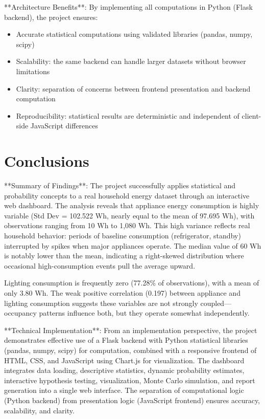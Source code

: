 \documentclass[12pt,a4paper]{article}
\begin{document}
**Architecture Benefits**:
By implementing all computations in Python (Flask backend), the project ensures:
\begin{itemize}
  \item Accurate statistical computations using validated libraries (pandas, numpy, scipy)
  \item Scalability: the same backend can handle larger datasets without browser limitations
  \item Clarity: separation of concerns between frontend presentation and backend computation
  \item Reproducibility: statistical results are deterministic and independent of client-side JavaScript differences
\end{itemize}

\section{Conclusions}
\label{sec:conclusion}

**Summary of Findings**:
The project successfully applies statistical and probability concepts to a real household energy dataset through an interactive web dashboard. The analysis reveals that appliance energy consumption is highly variable (Std Dev = 102.522 Wh, nearly equal to the mean of 97.695 Wh), with observations ranging from 10 Wh to 1,080 Wh. This high variance reflects real household behavior: periods of baseline consumption (refrigerator, standby) interrupted by spikes when major appliances operate. The median value of 60 Wh is notably lower than the mean, indicating a right-skewed distribution where occasional high-consumption events pull the average upward.

Lighting consumption is frequently zero (77.28\% of observations), with a mean of only 3.80 Wh. The weak positive correlation (0.197) between appliance and lighting consumption suggests these variables are not strongly coupled—occupancy patterns influence both, but they operate somewhat independently.

**Technical Implementation**:
From an implementation perspective, the project demonstrates effective use of a Flask backend with Python statistical libraries (pandas, numpy, scipy) for computation, combined with a responsive frontend of HTML, CSS, and JavaScript using Chart.js for visualization. The dashboard integrates data loading, descriptive statistics, dynamic probability estimates, interactive hypothesis testing, visualization, Monte Carlo simulation, and report generation into a single web interface. The separation of computational logic (Python backend) from presentation logic (JavaScript frontend) ensures accuracy, scalability, and clarity.
\end{document}
